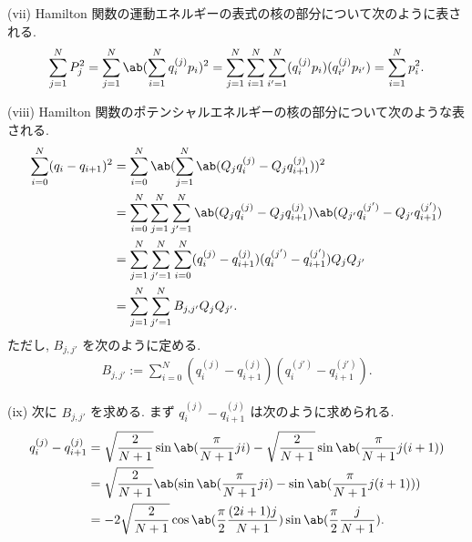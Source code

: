 \documentclass[uplatex,dvipdfmx,a4paper,11pt]{jlreq}
\numberwithin{equation}{section}
\theoremstyle{definition}
\begin{document}
(vii) Hamilton 関数の運動エネルギーの表式の核の部分について次のように表される.
\begin{align}
  \sum_{j=1}^{N}P_j^2 = \sum_{j=1}^{N}\ab(\sum_{i=1}^{N}q_i^{(j)}p_i)^2 = \sum_{j=1}^{N}\sum_{i=1}^{N}\sum_{i'=1}^{N}(q_i^{(j)}p_i)(q_{i'}^{(j)}p_{i'}) = \sum_{i=1}^{N}p_i^2.
\end{align}

(viii) Hamilton 関数のポテンシャルエネルギーの核の部分について次のような表される.
\begin{align}
  \sum_{i=0}^{N}(q_i - q_{i+1})^2 & = \sum_{i=0}^{N}\ab(\sum_{j=1}^{N}\ab(Q_jq_i^{(j)} - Q_jq_{i+1}^{(j)}))^2                                                     \\
                                  & = \sum_{i=0}^{N}\sum_{j=1}^{N}\sum_{j'=1}^{N}\ab(Q_jq_i^{(j)} - Q_jq_{i+1}^{(j)})\ab(Q_{j'}q_i^{(j')} - Q_{j'}q_{i+1}^{(j')}) \\
                                  & = \sum_{j=1}^{N}\sum_{j'=1}^{N}\sum_{i=0}^{N}(q_i^{(j)} - q_{i+1}^{(j)})(q_i^{(j')} - q_{i+1}^{(j')})Q_jQ_{j'}                \\
                                  & = \sum_{j=1}^{N}\sum_{j'=1}^{N}B_{j,j'}Q_jQ_{j'}.
\end{align}
ただし, $B_{j,j'}$ を次のように定める.
\begin{align}
  B_{j,j'} := \sum_{i=0}^{N}(q_i^{(j)} - q_{i+1}^{(j)})(q_i^{(j')} - q_{i+1}^{(j')}).
\end{align}

(ix) 次に $B_{j,j'}$ を求める. まず $q_i^{(j)} - q_{i+1}^{(j)}$ は次のように求められる.
\begin{align}
  q_i^{(j)} - q_{i+1}^{(j)} & = \sqrt{\frac{2}{N+1}}\sin\ab(\frac{\pi}{N+1}ji) - \sqrt{\frac{2}{N+1}}\sin\ab(\frac{\pi}{N+1}j(i+1)) \\
                            & = \sqrt{\frac{2}{N+1}}\ab(\sin\ab(\frac{\pi}{N+1}ji) - \sin\ab(\frac{\pi}{N+1}j(i+1)))                \\
                            & = -2\sqrt{\frac{2}{N+1}}\cos\ab(\frac{\pi}{2}\frac{(2i+1)j}{N+1})\sin\ab(\frac{\pi}{2}\frac{j}{N+1}).
\end{align}
\end{document}
